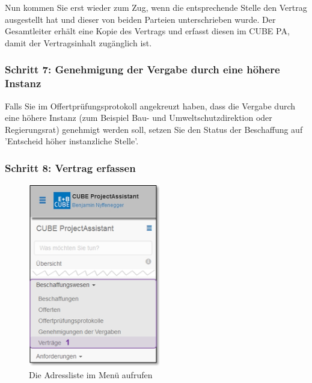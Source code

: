 \vspace{\baselineskip}

Nun kommen Sie erst wieder zum Zug, wenn die entsprechende Stelle den Vertrag ausgestellt hat und dieser von beiden Parteien unterschrieben wurde. Der Gesamtleiter erhält eine Kopie des Vertrags und erfasst diesen im CUBE PA, damit der Vertragsinhalt zugänglich ist.

\subsubsection{Schritt 7: Genehmigung der Vergabe durch eine höhere Instanz}

Falls Sie im Offertprüfungsprotokoll angekreuzt haben, dass die Vergabe durch eine höhere Instanz (zum Beispiel Bau- und Umweltschutzdirektion oder Regierungsrat) genehmigt werden soll, setzen Sie den Status der Beschaffung auf 'Entscheid höher instanzliche Stelle'.

\subsubsection{Schritt 8: Vertrag erfassen}

\begin{figure}
  \vspace{-30pt}      %
  \begin{center}
    \includegraphics[height=80mm]{../chapters/07_Beschaffungswesen/pictures/7-1-8_Menu_Besch_Vertraege.jpg}
  \end{center}
  \vspace{-20pt}
  \caption{Die Adressliste im Menü aufrufen}
  \vspace{-10pt}
\end{figure}

